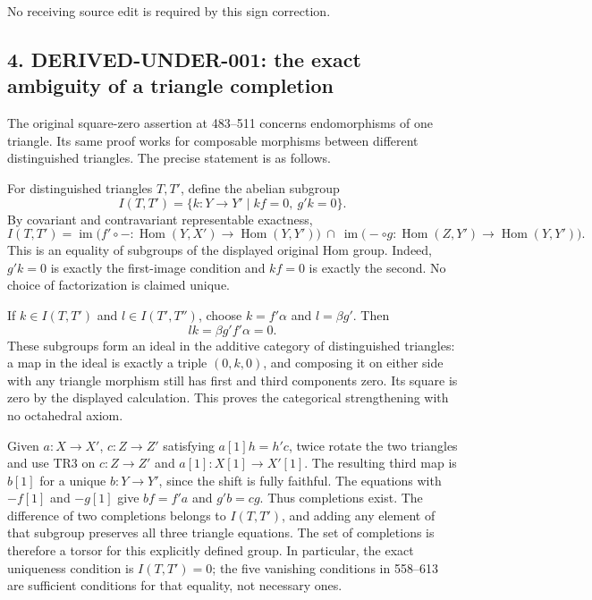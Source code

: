 \documentclass[11pt]{article}
\begin{document}
No receiving source edit is required by this sign correction.

\subsection{\texorpdfstring{4. DERIVED-UNDER-001:\allowbreak{} the exact ambiguity of a triangle completion}{4.  the exact ambiguity of a triangle completion}}\label{proofs-0001-1140-derived-under-001-the-exact-ambiguity-of-a-triangle-completion}

The original square-zero assertion at 483–\allowbreak{}511 concerns endomorphisms of one triangle. Its same proof works for composable morphisms between different distinguished triangles. The precise statement is as follows.

For distinguished triangles \(T,T'\),\allowbreak{} define the abelian subgroup \[
I(T,T')=\{k:Y\to Y'\mid kf=0,\ g'k=0\}.
\] By covariant and contravariant representable exactness,\allowbreak{} \[
I(T,T')=
\operatorname{im}\bigl(f'\circ-:\operatorname{Hom}(Y,X')
\to\operatorname{Hom}(Y,Y')\bigr)
\ \cap\
\operatorname{im}\bigl(-\circ g:\operatorname{Hom}(Z,Y')
\to\operatorname{Hom}(Y,Y')\bigr).
\] This is an equality of subgroups of the displayed original Hom group. Indeed,\allowbreak{} \(g'k=0\) is exactly the first-image condition and \(kf=0\) is exactly the second. No choice of factorization is claimed unique.

If \(k\in I(T,T')\) and \(l\in I(T',T'')\),\allowbreak{} choose \(k=f'\alpha\) and \(l=\beta g'\). Then \[
lk=\beta g'f'\alpha=0.
\] These subgroups form an ideal in the additive category of distinguished triangles:\allowbreak{} a map in the ideal is exactly a triple \((0,k,0)\),\allowbreak{} and composing it on either side with any triangle morphism still has first and third components zero. Its square is zero by the displayed calculation. This proves the categorical strengthening with no octahedral axiom.

Given \(a:X\to X'\),\allowbreak{} \(c:Z\to Z'\) satisfying \(a[1]h=h'c\),\allowbreak{} twice rotate the two triangles and use TR3 on \(c:Z\to Z'\) and \(a[1]:X[1]\to X'[1]\). The resulting third map is \(b[1]\) for a unique \(b:Y\to Y'\),\allowbreak{} since the shift is fully faithful. The equations with \(-f[1]\) and \(-g[1]\) give \(bf=f'a\) and \(g'b=cg\). Thus completions exist. The difference of two completions belongs to \(I(T,T')\),\allowbreak{} and adding any element of that subgroup preserves all three triangle equations. The set of completions is therefore a torsor for this explicitly defined group. In particular,\allowbreak{} the exact uniqueness condition is \(I(T,T')=0\); the five vanishing conditions in 558–\allowbreak{}613 are sufficient conditions for that equality,\allowbreak{} not necessary ones.
\end{document}
